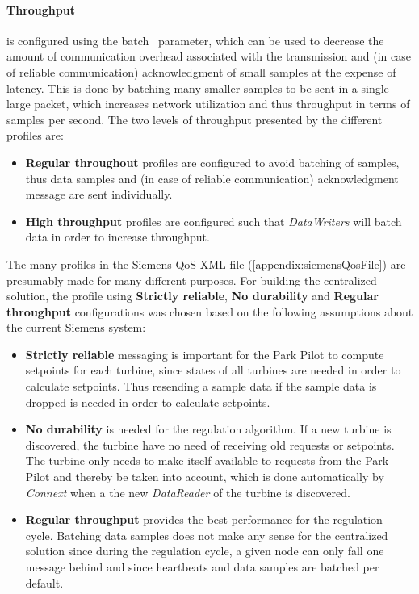 \paragraph{Throughput} is configured using the batch~\cite{rtiConnextUsersManual} parameter, which can be used to decrease the amount of communication overhead associated with the transmission and (in case of reliable communication) acknowledgment of small samples at the expense of latency. This is done by batching many smaller samples to be sent in a single large packet, which increases network utilization and thus throughput in terms of samples per second. The two levels of throughput presented by the different profiles are:

\begin{itemize}
	\item \textbf{Regular throughout} profiles are configured to avoid batching of samples, thus data samples and (in case of reliable communication) acknowledgment message are sent individually.
	\item \textbf{High throughput} profiles are configured such that \textit{DataWriters} will batch data in order to increase throughput.
\end{itemize}

The many profiles in the Siemens QoS XML file (\cref{appendix:siemensQosFile}) are presumably made for many different purposes. For building the centralized solution, the profile using \textbf{Strictly reliable}, \textbf{No durability} and \textbf{Regular throughput} configurations was chosen based on the following assumptions about the current Siemens system:

\begin{itemize}
	\item \textbf{Strictly reliable} messaging is important for the Park Pilot to compute setpoints for each turbine, since states of all turbines are needed in order to calculate setpoints. Thus resending a sample data if the sample data is dropped is needed in order to calculate setpoints. 
	\item \textbf{No durability} is needed for the regulation algorithm. If a new turbine is discovered, the turbine have no need of receiving old requests or setpoints. The turbine only needs to make itself available to requests from the Park Pilot and thereby be taken into account, which is done automatically by \textit{Connext} when a the new \textit{DataReader} of the turbine is discovered.  
	\item \textbf{Regular throughput} provides the best performance for the regulation cycle. Batching data samples does not make any sense for the centralized solution since during the regulation cycle, a given node can only fall one message behind and since heartbeats and data samples are batched per default.
\end{itemize}

